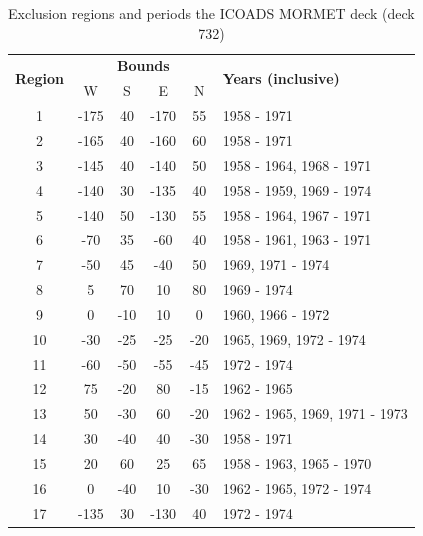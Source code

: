 {\begin{table}
\centering
\caption{Exclusion regions and periods the ICOADS MORMET deck (deck 732)}
\label{tab:mormet}
\begin{tabular}{|c|c|c|c|c|l|}
\hline
\multirow{2}{*}{\bfseries Region} & \multicolumn{4}{c|}{\bfseries Bounds } & \multirow{2}{*}{\bfseries Years (inclusive)} \\ \cline{2-5}
   &   W  &  S  &    E &   N & \\\hline
1  & -175 &  40 & -170 &  55 & 1958 - 1971 \\\hline
2  & -165 &  40 & -160 &  60 & 1958 - 1971 \\\hline
3  & -145 &  40 & -140 &  50 & 1958 - 1964, 1968 - 1971 \\\hline
4  & -140 &  30 & -135 &  40 & 1958 - 1959, 1969 - 1974 \\\hline
5  & -140 &  50 & -130 &  55 & 1958 - 1964, 1967 - 1971 \\\hline
6  &  -70 &  35 &  -60 &  40 & 1958 - 1961, 1963 - 1971 \\\hline
7  &  -50 &  45 &  -40 &  50 & 1969, 1971 - 1974 \\\hline
8  &    5 &  70 &   10 &  80 & 1969 - 1974 \\\hline
9  &    0 & -10 &   10 &   0 & 1960, 1966 - 1972 \\\hline
10 &  -30 & -25 &  -25 & -20 & 1965, 1969, 1972 - 1974 \\\hline
11 &  -60 & -50 &  -55 & -45 & 1972 - 1974 \\\hline
12 &   75 & -20 &   80 & -15 & 1962 - 1965 \\\hline
13 &   50 & -30 &   60 & -20 & 1962 - 1965, 1969, 1971 - 1973 \\\hline
14 &   30 & -40 &   40 & -30 & 1958 - 1971 \\\hline
15 &   20 &  60 &   25 &  65 & 1958 - 1963, 1965 - 1970 \\\hline
16 &    0 & -40 &   10 & -30 & 1962 - 1965, 1972 - 1974 \\\hline
17 & -135 &  30 & -130 &  40 & 1972 - 1974 \\\hline
\end{tabular}
\end{table}

\FloatBarrier


}
